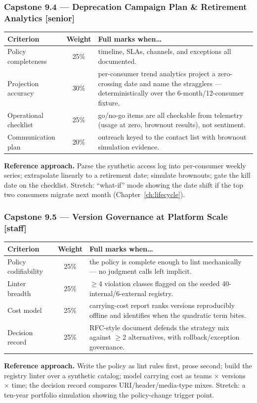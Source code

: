 \subsubsection*{Capstone 9.4 --- Deprecation Campaign Plan \& Retirement Analytics [senior]}
\begin{center}\small
\begin{tabularx}{\textwidth}{l c X}
\toprule
\textbf{Criterion} & \textbf{Weight} & \textbf{Full marks when\ldots} \\
\midrule
Policy completeness & 25\% & timeline, SLAs, channels, and exceptions all documented. \\
Projection accuracy & 30\% & per-consumer trend analytics project a zero-crossing date and name the stragglers --- deterministically over the 6-month/12-consumer fixture. \\
Operational checklist & 25\% & go/no-go items are all checkable from telemetry (usage at zero, brownout results), not sentiment. \\
Communication plan & 20\% & outreach keyed to the contact list with brownout simulation evidence. \\
\bottomrule
\end{tabularx}
\end{center}
\textbf{Reference approach.} Parse the synthetic access log into
per-consumer weekly series; extrapolate linearly to a retirement date;
simulate brownouts; gate the kill date on the checklist. Stretch:
``what-if'' mode showing the date shift if the top two consumers migrate
next month (Chapter~\ref{ch:lifecycle}).

\subsubsection*{Capstone 9.5 --- Version Governance at Platform Scale [staff]}
\begin{center}\small
\begin{tabularx}{\textwidth}{l c X}
\toprule
\textbf{Criterion} & \textbf{Weight} & \textbf{Full marks when\ldots} \\
\midrule
Policy codifiability & 25\% & the policy is complete enough to lint mechanically --- no judgment calls left implicit. \\
Linter breadth & 25\% & $\geq$4 violation classes flagged on the seeded 40-internal/6-external registry. \\
Cost model & 25\% & carrying-cost report ranks versions reproducibly offline and identifies when the quadratic term bites. \\
Decision record & 25\% & RFC-style document defends the strategy mix against $\geq$2 alternatives, with rollback/exception governance. \\
\bottomrule
\end{tabularx}
\end{center}
\textbf{Reference approach.} Write the policy as lint rules first, prose
second; build the registry linter over a synthetic catalog; model carrying
cost as teams $\times$ versions $\times$ time; the decision record compares
URI/header/media-type mixes. Stretch: a ten-year portfolio simulation
showing the policy-change trigger point.

